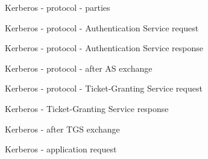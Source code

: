 \documentclass[ignorenonframetext,aspectratio=169,12pt]{beamer}
\def\svgwidth{4cm}
\begin{document}
\begin{frame}{Kerberos - protocol - parties}
\begin{center}
\def\svgwidth{\textwidth}

\end{center}
\end{frame}

\begin{frame}{Kerberos - protocol - Authentication Service request}
\begin{center}
\def\svgwidth{\textwidth}

\end{center}
\end{frame}

\begin{frame}{Kerberos - protocol - Authentication Service response}
\begin{center}
\def\svgwidth{\textwidth}

\end{center}
\end{frame}

\begin{frame}{Kerberos - protocol - after AS exchange}
\begin{center}
\def\svgwidth{\textwidth}

\end{center}
\end{frame}

\begin{frame}{Kerberos - protocol - Ticket-Granting Service request}
\begin{center}
\def\svgwidth{\textwidth}

\end{center}
\end{frame}

\begin{frame}{Kerberos - Ticket-Granting Service response}
\begin{center}
\def\svgwidth{\textwidth}

\end{center}
\end{frame}

\begin{frame}{Kerberos - after TGS exchange}
\begin{center}
\def\svgwidth{\textwidth}

\end{center}
\end{frame}

\begin{frame}{Kerberos - application request}
\begin{center}
\def\svgwidth{\textwidth}

\end{center}
\end{frame}
\end{document}
